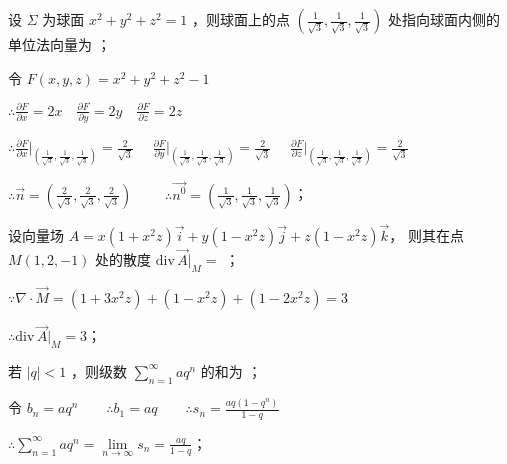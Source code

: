 \documentclass{exam-zh}
\begin{document}
\begin{question}[points = 3]
    设 $\Sigma$ 为球面 $x^2 + y^2 + z^2 = 1$ ，则球面上的点 $\left(\frac{1}{\sqrt{3}}, \frac{1}{\sqrt{3}}, \frac{1}{\sqrt{3}}\right)$
    处指向球面内侧的单位法向量为 ；
\end{question}
\begin{solution}
    令 $F\left(x, y, z\right) = x^2 + y^2 + z^2 - 1$

    $\therefore \frac{\partial F}{\partial x} = 2x \quad \frac{\partial F}{\partial y} = 2y \quad \frac{\partial F}{\partial z} = 2z$

    $\therefore \frac{\partial F}{\partial x}|_{\left(\frac{1}{\sqrt{3}}, \frac{1}{\sqrt{3}}, \frac{1}{\sqrt{3}}\right)} = \frac{2}{\sqrt{3}} \quad$
    $\frac{\partial F}{\partial y}|_{\left(\frac{1}{\sqrt{3}}, \frac{1}{\sqrt{3}}, \frac{1}{\sqrt{3}}\right)} = \frac{2}{\sqrt{3}}$
    $\quad \frac{\partial F}{\partial z}|_{\left(\frac{1}{\sqrt{3}}, \frac{1}{\sqrt{3}}, \frac{1}{\sqrt{3}}\right)} = \frac{2}{\sqrt{3}}$

    $\therefore \vec{n} = \left(\frac{2}{\sqrt{3}}, \frac{2}{\sqrt{3}}, \frac{2}{\sqrt{3}}\right) \qquad$
    $\therefore \vec{n^0} = \left(\frac{1}{\sqrt{3}}, \frac{1}{\sqrt{3}}, \frac{1}{\sqrt{3}}\right)$；
\end{solution}

\begin{question}[points = 3]
    设向量场 $A = x(1 + x^2z)\vec{i} + y(1 - x^2z)\vec{j} + z(1 - x^2z)\vec{k}$，
    则其在点 $M(1, 2, -1)$ 处的散度 $\mathrm{div} \, \vec{A}|_M = $ \fillin[3]；
\end{question}
\begin{solution}
    $\because \nabla\cdot\vec{M} = (1 + 3x^2z) + (1-x^2z) + (1-2x^2z) = 3$

    $\therefore \mathrm{div} \, \vec{A}|_M = 3$；
\end{solution}

\begin{question}[points = 3]
    若 $|q| < 1$ ，则级数 $\sum\limits_{n = 1}^{\infty} aq^n$ 的和为 \fillin[$\frac{aq}{1 - q}$]；
\end{question}
\begin{solution}
    令 $b_n = aq^n \qquad \therefore b_1 = aq \qquad \therefore s_n = \frac{aq(1 - q^n)}{1 - q}$

    $\therefore \sum\limits_{n = 1}^{\infty} aq^n = \lim\limits_{n \to \infty} s_n = \frac{aq}{1 - q}$；
\end{solution}
\end{document}
